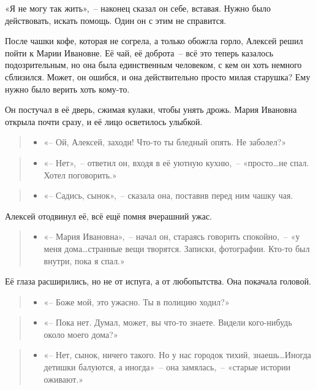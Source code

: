 \documentclass[12pt,a4paper]{book}
\newenvironment{dialogue}{\begin{quote}\itshape\begin{itemize}\item[]}{\end{itemize}\end{quote}}
\begin{document}
«Я не могу так жить»,~-- наконец сказал он себе, вставая. Нужно было действовать, искать помощь. Один он с этим не справится.

После чашки кофе, которая не согрела, а только обожгла горло, Алексей решил пойти к Марии Ивановне. Её чай, её доброта~-- всё это теперь казалось подозрительным, но она была единственным человеком, с кем он хоть немного сблизился. Может, он ошибся, и она действительно просто милая старушка? Ему нужно было верить хоть кому-то.

Он постучал в её дверь, сжимая кулаки, чтобы унять дрожь. Мария Ивановна открыла почти сразу, и её лицо осветилось улыбкой.

\begin{dialogue}
«-- Ой, Алексей, заходи! Что-то ты бледный опять. Не заболел?»
\end{dialogue}

\begin{dialogue}
«-- Нет»,~-- ответил он, входя в её уютную кухню,~-- «просто\ldots не спал. Хотел поговорить.»
\end{dialogue}

\begin{dialogue}
«-- Садись, сынок»,~-- сказала она, поставив перед ним чашку чая. 
\end{dialogue}

Алексей отодвинул её, всё ещё помня вчерашний ужас.

\begin{dialogue}
«-- Мария Ивановна»,~-- начал он, стараясь говорить спокойно,~-- «у меня дома\ldots странные вещи творятся. Записки, фотографии. Кто-то был внутри, пока я спал.»
\end{dialogue}

Её глаза расширились, но не от испуга, а от любопытства. Она покачала головой.

\begin{dialogue}
«-- Боже мой, это ужасно. Ты в полицию ходил?»
\end{dialogue}

\begin{dialogue}
«-- Пока нет. Думал, может, вы что-то знаете. Видели кого-нибудь около моего дома?»
\end{dialogue}

\begin{dialogue}
«-- Нет, сынок, ничего такого. Но у нас городок тихий, знаешь\ldots Иногда детишки балуются, а иногда»~-- она замялась,~-- «старые истории оживают.»
\end{dialogue}
\end{document}
